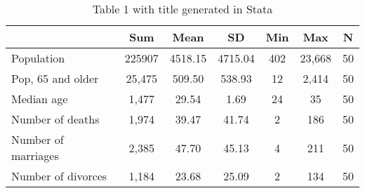 \begin{table}[htbp]\centering
\def\sym#1{\ifmmode^{#1}\else\(^{#1}\)\fi}
\caption{Table 1 with title generated in Stata \label{table1stata}}
\begin{tabular}{l*{1}{cccccc}}
\toprule
                    &         Sum&        Mean&          SD&         Min&         Max&           N\\
\midrule
Population          &      225907&     4518.15&     4715.04&         402&      23,668&          50\\
Pop, 65 and older   &      25,475&      509.50&      538.93&          12&       2,414&          50\\
Median age          &       1,477&       29.54&        1.69&          24&          35&          50\\
Number of deaths    &       1,974&       39.47&       41.74&           2&         186&          50\\
Number of marriages &       2,385&       47.70&       45.13&           4&         211&          50\\
Number of divorces  &       1,184&       23.68&       25.09&           2&         134&          50\\
\bottomrule
\end{tabular}
\end{table}
